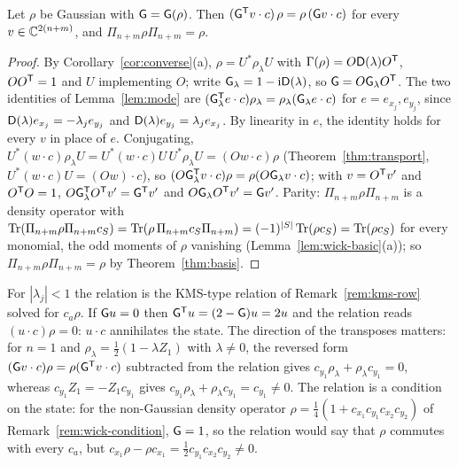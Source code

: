 \begin{theorem}\label{thm:relation}
Let $\rho$ be Gaussian with $\mathsf G=\mathsf G(\rho)$. Then $(\mathsf G^{\mathsf T}v\cdot c)\,\rho=\rho\,(\mathsf G v\cdot c)$ for
every $v\in\mathbb C^{2(n+m)}$, and $\Pi_{n+m}\rho\Pi_{n+m}=\rho$.
\end{theorem}
\begin{proof}
By Corollary~\ref{cor:converse}(a), $\rho=U^*\rho_\lambda U$ with $\Gamma(\rho)=O\mathsf D(\lambda)O^{\mathsf T}$,
$OO^{\mathsf T}=1$ and $U$ implementing $O$; write $\mathsf G_\lambda=1-\mathrm i\mathsf D(\lambda)$, so $\mathsf G=O\mathsf G_\lambda O^{\mathsf T}$.
The two identities of Lemma~\ref{lem:mode} are
$(\mathsf G_\lambda^{\mathsf T}e\cdot c)\rho_\lambda=\rho_\lambda(\mathsf G_\lambda e\cdot c)$ for $e=e_{x_j},e_{y_j}$, since
$\mathsf D(\lambda)e_{x_j}=-\lambda_je_{y_j}$ and $\mathsf D(\lambda)e_{y_j}=\lambda_je_{x_j}$. By linearity in
$e$, the identity holds for every $v$ in place of $e$. Conjugating,
$U^*(w\cdot c)\rho_\lambda U=U^*(w\cdot c)U\,U^*\rho_\lambda U=(Ow\cdot c)\rho$
(Theorem~\ref{thm:transport}, $U^*(w\cdot c)U=(Ow)\cdot c$), so
$(O\mathsf G_\lambda^{\mathsf T}v\cdot c)\rho=\rho(O\mathsf G_\lambda v\cdot c)$; with $v=O^{\mathsf T}v'$ and $O^{\mathsf T}O=1$,
$O\mathsf G_\lambda^{\mathsf T}O^{\mathsf T}v'=\mathsf G^{\mathsf T}v'$ and $O\mathsf G_\lambda O^{\mathsf T}v'=\mathsf G v'$. Parity: $\Pi_{n+m}\rho\Pi_{n+m}$
is a density operator with
$\operatorname{Tr}(\Pi_{n+m}\rho\Pi_{n+m}c_S)=\operatorname{Tr}(\rho\,\Pi_{n+m}c_S\Pi_{n+m})=(-1)^{|S|}\operatorname{Tr}(\rho c_S)=\operatorname{Tr}(\rho c_S)$
for every monomial, the odd moments of $\rho$ vanishing (Lemma~\ref{lem:wick-basic}(a)); so
$\Pi_{n+m}\rho\Pi_{n+m}=\rho$ by Theorem~\ref{thm:basis}.
\end{proof}
\begin{remark}\label{rem:relation}
For $|\lambda_j|<1$ the relation is the KMS-type relation of Remark~\ref{rem:kms-row}
solved for $c_a\rho$. If $\mathsf G u=0$ then $\mathsf G^{\mathsf T}u=(2-\mathsf G)u=2u$ and the relation reads
$(u\cdot c)\rho=0$: $u\cdot c$ annihilates the state. The direction of the transposes matters:
for $n=1$ and $\rho_\lambda=\tfrac12(1-\lambda Z_1)$ with $\lambda\neq0$, the reversed form
$(\mathsf G v\cdot c)\rho=\rho(\mathsf G^{\mathsf T}v\cdot c)$ subtracted from the relation gives
$c_{y_1}\rho_\lambda+\rho_\lambda c_{y_1}=0$, whereas $c_{y_1}Z_1=-Z_1c_{y_1}$ gives
$c_{y_1}\rho_\lambda+\rho_\lambda c_{y_1}=c_{y_1}\neq0$. The relation is a condition on the
state: for the non-Gaussian density operator $\rho=\tfrac14(1+c_{x_1}c_{y_1}c_{x_2}c_{y_2})$ of
Remark~\ref{rem:wick-condition}, $\mathsf G=1$, so the relation would say that $\rho$ commutes with
every $c_a$, but $c_{x_1}\rho-\rho c_{x_1}=\tfrac12c_{y_1}c_{x_2}c_{y_2}\neq0$.
\end{remark}


